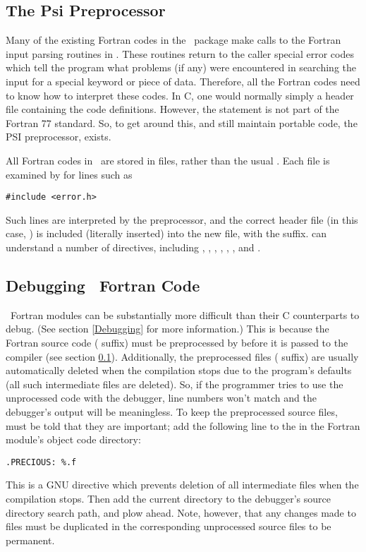 \subsection{The Psi Preprocessor}\label{psipp}
Many of the existing Fortran codes in the \PSIthree\ package make
calls to the Fortran input parsing routines in .
These routines return to the caller special error codes which tell the
program what problems (if any) were encountered in searching the input
for a special keyword or piece of data.  Therefore, all the Fortran
codes need to know how to interpret these codes.  In C, one would
normally simply  a header file containing the code
definitions.  However, the  statement is not part of
the Fortran 77 standard.  So, to get around this, and still maintain
portable code, the PSI preprocessor,  exists.

All Fortran codes in \PSIthree\ are stored in  files, rather than the
usual .  Each  file is examined by  for lines
such as
\begin{verbatim} 
#include <error.h>
\end{verbatim}
Such lines are interpreted by the preprocessor, and the correct header
file (in this case, ) is included (literally inserted)
into the new file, with the  suffix.   can
understand a number of directives, including ,
, , , ,
, and .

\subsection{Debugging \PSIthree\ Fortran Code}

\PSIthree\ Fortran modules can be substantially more difficult than
their C counterparts to debug.  (See section \ref{Debugging} for more
information.)  This is because the Fortran source code (
suffix) must be preprocessed by  before it is passed to
the compiler (see section \ref{psipp}).  Additionally, the
preprocessed files ( suffix) are usually automatically
deleted when the compilation stops due to the  program's
defaults (all such intermediate files are deleted).  So, if the
programmer tries to use the unprocessed code with the debugger, line
numbers won't match and the debugger's output will be meaningless.  To
keep the preprocessed source files,  must be told that they
are important; add the following line to the  in the
Fortran module's object code directory:
\begin{verbatim}
.PRECIOUS: %.f
\end{verbatim}
This is a GNU  directive which prevents deletion of all
intermediate  files when the compilation stops.  Then add the
current directory to the debugger's source directory search path, and
plow ahead.  Note, however, that any changes made to  files
must be duplicated in the corresponding unprocessed source 
files to be permanent.


